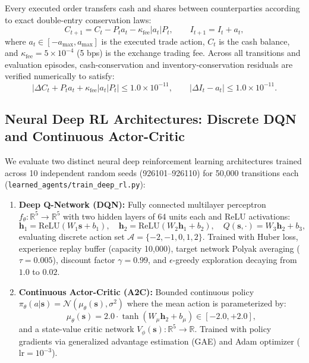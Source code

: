 \documentclass[11pt,a4paper]{article}
\theoremstyle{definition}\newtheorem{definition}[theorem]{Definition}
\theoremstyle{remark}\newtheorem{remark}[theorem]{Remark}
\begin{document}
Every executed order transfers cash and shares between counterparties according to exact double-entry conservation laws:
\begin{equation}
C_{t+1} = C_t - P_t a_t - \kappa_{\text{fee}} |a_t| P_t, \qquad I_{t+1} = I_t + a_t,
\end{equation}
where $a_t \in [-a_{\max}, a_{\max}]$ is the executed trade action, $C_t$ is the cash balance, and $\kappa_{\text{fee}} = 5 \times 10^{-4}$ (5 bps) is the exchange trading fee. Across all transitions and evaluation episodes, cash-conservation and inventory-conservation residuals are verified numerically to satisfy:
\begin{equation}
|\Delta C_t + P_t a_t + \kappa_{\text{fee}} |a_t| P_t| \le 1.0 \times 10^{-11}, \qquad |\Delta I_t - a_t| \le 1.0 \times 10^{-11}.
\end{equation}

\subsection{Neural Deep RL Architectures: Discrete DQN and Continuous Actor-Critic}
We evaluate two distinct neural deep reinforcement learning architectures trained across 10 independent random seeds (926101--926110) for 50,000 transitions each (\nolinkurl{learned_agents/train_deep_rl.py}):
\begin{enumerate}
    \item \textbf{Deep Q-Network (DQN):} Fully connected multilayer perceptron $f_\theta: \mathbb{R}^5 \to \mathbb{R}^5$ with two hidden layers of 64 units each and ReLU activations:
    \begin{equation}
    \mathbf{h}_1 = \text{ReLU}(W_1 \mathbf{s} + b_1), \quad \mathbf{h}_2 = \text{ReLU}(W_2 \mathbf{h}_1 + b_2), \quad Q(\mathbf{s}, \cdot) = W_3 \mathbf{h}_2 + b_3,
    \end{equation}
    evaluating discrete action set $\mathcal{A} = \{-2, -1, 0, 1, 2\}$. Trained with Huber loss, experience replay buffer (capacity 10,000), target network Polyak averaging ($\tau = 0.005$), discount factor $\gamma = 0.99$, and $\epsilon$-greedy exploration decaying from $1.0$ to $0.02$.
    \item \textbf{Continuous Actor-Critic (A2C):} Bounded continuous policy $\pi_\theta(a|\mathbf{s}) = \mathcal{N}(\mu_\theta(\mathbf{s}), \sigma^2)$ where the mean action is parameterized by:
    \begin{equation}
    \mu_\theta(\mathbf{s}) = 2.0 \cdot \tanh(W_\mu \mathbf{h}_2 + b_\mu) \in [-2.0, +2.0],
    \end{equation}
    and a state-value critic network $V_\phi(\mathbf{s}): \mathbb{R}^5 \to \mathbb{R}$. Trained with policy gradients via generalized advantage estimation (GAE) and Adam optimizer ($\text{lr} = 10^{-3}$).
\end{enumerate}
\end{document}
